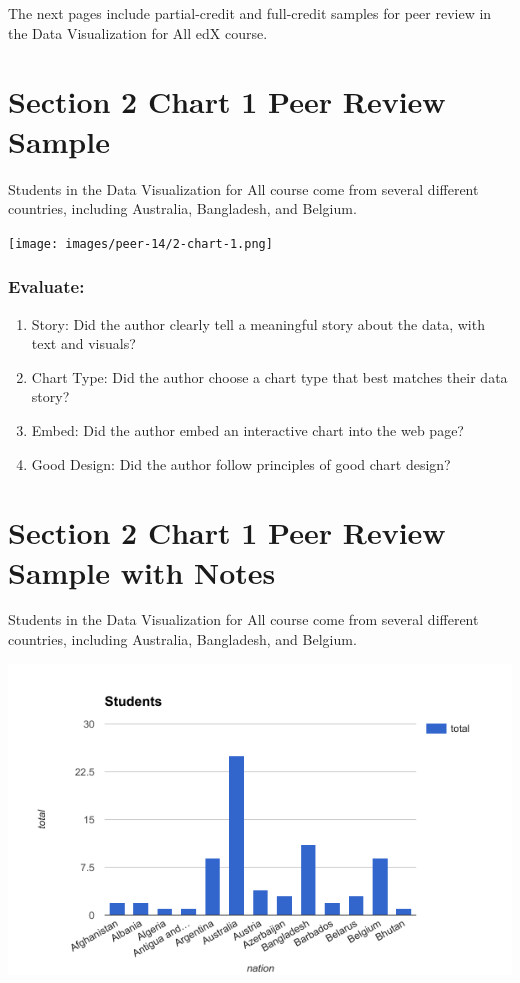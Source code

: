 \documentclass[
  english,
]{book}
\providecommand{\tightlist}{%
  \setlength{\itemsep}{0pt}\setlength{\parskip}{0pt}}
\begin{document}
The next pages include partial-credit and full-credit samples for peer review in the Data Visualization for All edX course.

\hypertarget{peer-2-chart-1}{%
\section{Section 2 Chart 1 Peer Review Sample}\label{peer-2-chart-1}}

Students in the Data Visualization for All course come from several different countries, including Australia, Bangladesh, and Belgium.

\texttt{[image: images/peer-14/2-chart-1.png]}

\hypertarget{evaluate}{%
\subsubsection{Evaluate:}\label{evaluate}}

\begin{enumerate}
\def\labelenumi{\arabic{enumi}.}
\tightlist
\item
  Story: Did the author clearly tell a meaningful story about the data, with text and visuals?
\item
  Chart Type: Did the author choose a chart type that best matches their data story?
\item
  Embed: Did the author embed an interactive chart into the web page?
\item
  Good Design: Did the author follow principles of good chart design?
\end{enumerate}

\hypertarget{peer-2-chart-1-notes}{%
\section{Section 2 Chart 1 Peer Review Sample with Notes}\label{peer-2-chart-1-notes}}

Students in the Data Visualization for All course come from several different countries, including Australia, Bangladesh, and Belgium.

\includegraphics{images/14-peer/2-chart-1.png}
\end{document}
